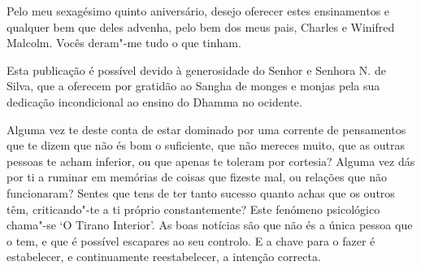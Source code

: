 \clearpage
\thispagestyle{empty}

{}

\vspace*{0.8\baselineskip}

Pelo meu sexagésimo quinto aniversário, desejo oferecer estes
ensinamentos e qualquer bem que deles advenha, pelo bem dos meus pais,
Charles e Winifred Malcolm. Vocês deram"-me tudo o que tinham.

\clearpage
\thispagestyle{empty}

{}

\enlargethispage*{\baselineskip}

\vspace*{0.8\baselineskip}

Esta publicação é possível devido à generosidade do Senhor e Senhora N.
de Silva, que a oferecem por gratidão ao Sangha de monges e monjas pela
sua dedicação incondicional ao ensino do Dhamma no ocidente.

Alguma vez te deste conta de estar dominado por uma corrente de
pensamentos que te dizem que não és bom o suficiente, que não mereces
muito, que as outras pessoas te acham inferior, ou que apenas te toleram
por cortesia? Alguma vez dás por ti a ruminar em memórias de coisas que
fizeste mal, ou relações que não funcionaram? Sentes que tens de ter
tanto sucesso quanto achas que os outros têm, criticando"-te a ti próprio
constantemente? Este fenómeno psicológico chama"-se ‘O Tirano Interior’.
As boas notícias são que não és a única pessoa que o tem, e que é
possível escapares ao seu controlo. E a chave para o fazer é
estabelecer, e continuamente reestabelecer, a intenção correcta.

